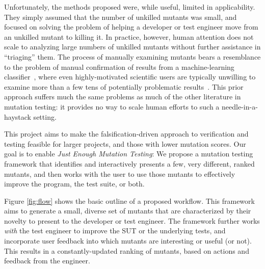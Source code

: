 Unfortunately, the
methods proposed were, while useful, limited in applicability.  They simply assumed that the number of unkilled mutants was
small, and focused on solving the problem of helping a developer or
test engineer move from an unkilled mutant to killing it.
In practice, however, human
attention does not scale to analyzing large numbers of 
unkilled mutants without further assistance in ``triaging'' them.  The process of manually examining mutants bears a
resemblance to the problem of manual confirmation of results from a
machine-learning classifier~\cite{OnlyOracle,EndUserMistake}, where even highly-motivated scientific
users are typically unwilling to examine more than a few tens of
potentially problematic results~\cite{Segal}.
This prior approach suffers much the same problems as much of the other
literature in mutation testing: it provides no way to
scale human efforts to such a needle-in-a-haystack setting. 

This project aims to make the falsification-driven approach to verification and testing feasible for larger
projects, and those with lower mutation scores.
Our goal is to enable \emph{Just Enough Mutation Testing}: We propose a mutation
testing framework that identifies and interactively presents a few, very
different, ranked mutants, and then works with the user to use those mutants to
effectively improve the program, the test suite, or both. 

Figure \ref{fig:flow} shows the basic outline of a proposed workflow.  
%
This framework aims to generate a small, diverse set of
mutants that are characterized by their novelty to present to the developer or
test engineer.  The framework further works
 \emph{with} the test engineer to improve the SUT or
the underlying tests, and incorporate user feedback into which mutants are
interesting or useful (or not).  This results in a constantly-updated ranking of mutants,
based on actions and feedback from the engineer. 


